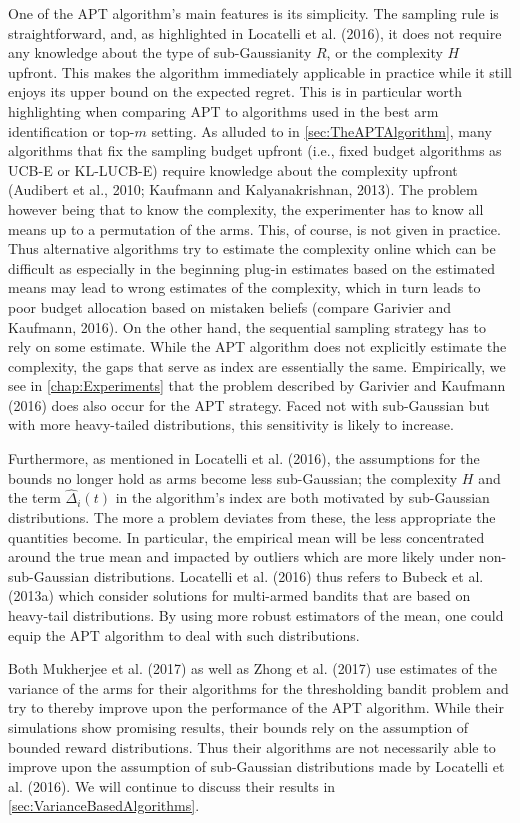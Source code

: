 \documentclass[11pt,]{article}
\begin{document}
One of the APT algorithm's main features is its simplicity. The sampling
rule is straightforward, and, as highlighted in Locatelli et al. (2016),
it does not require any knowledge about the type of sub-Gaussianity
\(R\), or the complexity \(H\) upfront. This makes the algorithm
immediately applicable in practice while it still enjoys its upper bound
on the expected regret. This is in particular worth highlighting when
comparing APT to algorithms used in the best arm identification or
top-\(m\) setting. As alluded to in \autoref{sec:TheAPTAlgorithm}, many
algorithms that fix the sampling budget upfront (i.e., fixed budget
algorithms as UCB-E or KL-LUCB-E) require knowledge about the complexity
upfront (Audibert et al., 2010; Kaufmann and Kalyanakrishnan, 2013). The
problem however being that to know the complexity, the experimenter has
to know all means up to a permutation of the arms. This, of course, is
not given in practice. Thus alternative algorithms try to estimate the
complexity online which can be difficult as especially in the beginning
plug-in estimates based on the estimated means may lead to wrong
estimates of the complexity, which in turn leads to poor budget
allocation based on mistaken beliefs (compare Garivier and Kaufmann,
2016). On the other hand, the sequential sampling strategy has to rely
on some estimate. While the APT algorithm does not explicitly estimate
the complexity, the gaps that serve as index are essentially the same.
Empirically, we see in \autoref{chap:Experiments} that the problem
described by Garivier and Kaufmann (2016) does also occur for the APT
strategy. Faced not with sub-Gaussian but with more heavy-tailed
distributions, this sensitivity is likely to increase.

Furthermore, as mentioned in Locatelli et al. (2016), the assumptions
for the bounds no longer hold as arms become less sub-Gaussian; the
complexity \(H\) and the term \(\hat{\Delta}_i(t)\) in the algorithm's
index are both motivated by sub-Gaussian distributions. The more a
problem deviates from these, the less appropriate the quantities become.
In particular, the empirical mean will be less concentrated around the
true mean and impacted by outliers which are more likely under
non-sub-Gaussian distributions. Locatelli et al. (2016) thus refers to
Bubeck et al. (2013a) which consider solutions for multi-armed bandits
that are based on heavy-tail distributions. By using more robust
estimators of the mean, one could equip the APT algorithm to deal with
such distributions.

Both Mukherjee et al. (2017) as well as Zhong et al. (2017) use
estimates of the variance of the arms for their algorithms for the
thresholding bandit problem and try to thereby improve upon the
performance of the APT algorithm. While their simulations show promising
results, their bounds rely on the assumption of bounded reward
distributions. Thus their algorithms are not necessarily able to improve
upon the assumption of sub-Gaussian distributions made by Locatelli et
al. (2016). We will continue to discuss their results in
\autoref{sec:VarianceBasedAlgorithms}.
\end{document}
